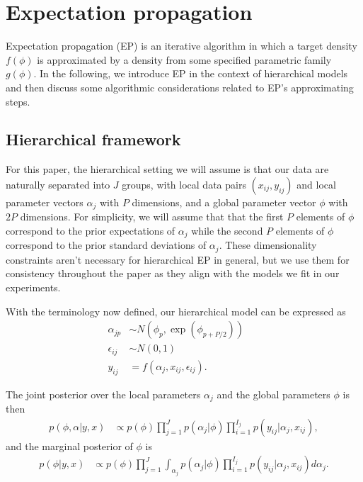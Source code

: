 \section{Expectation propagation}
\label{sec:ep_ep}

Expectation propagation (EP) is an iterative algorithm in which a target density $f(\phi)$ is approximated by a density from some specified parametric family $g(\phi)$. In the following, we introduce EP in the context of hierarchical models and then discuss some algorithmic considerations related to EP's approximating steps.

\subsection{Hierarchical framework}
\label{subsec:ep_hierarchical}

For this paper, the hierarchical setting we will assume is that our data are naturally separated into $J$ groups, with local data pairs $(x_{ij}, y_{ij})$ and local parameter vectors $\alpha_j$ with $P$ dimensions, and a global parameter vector $\phi$ with $2P$ dimensions. For simplicity, we will assume that that the first $P$ elements of $\phi$ correspond to the prior expectations of $\alpha_j$ while the second $P$ elements of $\phi$ correspond to the prior standard deviations of $\alpha_j$. These dimensionality constraints aren't necessary for hierarchical EP in general, but we use them for consistency throughout the paper as they align with the models we fit in our experiments.

With the terminology now defined, our hierarchical model can be expressed as
\begin{align}
\alpha_{jp} 
&\sim N(\phi_p, \exp(\phi_{p + P/2})) && \\\nonumber
\epsilon_{ij} 
&\sim N(0,1) && \\\nonumber
y_{ij} 
&= f( \alpha_j, x_{ij}, \epsilon_{ij}).
\end{align}

The joint posterior over the local parameters $\alpha_j$ and the global parameters $\phi$ is then
\begin{align}
p(\phi, \alpha | y, x) 
&\propto p(\phi) \prod_{j=1}^J p( \alpha_j | \phi) \prod_{i=1}^{I_j} p(y_{ij} | \alpha_j, x_{ij} ),
\end{align}
and the marginal posterior of $\phi$ is
\begin{align}
p(\phi | y, x) 
&\propto p(\phi) \prod_{j=1}^J \int_{\alpha_j} p( \alpha_j | \phi) \prod_{i=1}^{I_j} p(y_{ij} | \alpha_j, x_{ij} ) d\alpha_j.
\end{align}

